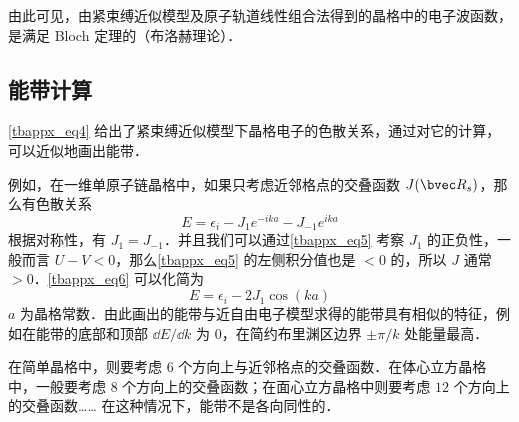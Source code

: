 由此可见，由紧束缚近似模型及原子轨道线性组合法得到的晶格中的电子波函数，是满足 Bloch 定理的（布洛赫理论）．

\subsection{能带计算}
\autoref{tbappx_eq4} 给出了紧束缚近似模型下晶格电子的色散关系，通过对它的计算，可以近似地画出能带．

例如，在一维单原子链晶格中，如果只考虑近邻格点的交叠函数 $J(\bvec R_s)$，那么有色散关系
\begin{equation}\label{tbappx_eq6}
E=\epsilon_i-J_1 e^{-i k a}-J_{-1}e^{ika}
\end{equation}
根据对称性，有 $J_1=J_{-1}$．并且我们可以通过\autoref{tbappx_eq5} 考察 $J_1$ 的正负性，一般而言 $U-V<0$，那么\autoref{tbappx_eq5} 的左侧积分值也是 $<0$ 的，所以 $J$ 通常 $>0$．\autoref{tbappx_eq6} 可以化简为
\begin{equation}
E=\epsilon_i-2J_1\cos(ka)
\end{equation}
$a$ 为晶格常数．由此画出的能带与近自由电子模型求得的能带具有相似的特征，例如在能带的底部和顶部 $\dd E/\dd k$ 为 $0$，在简约布里渊区边界 $\pm \pi/k$ 处能量最高．

在简单晶格中，则要考虑 $6$ 个方向上与近邻格点的交叠函数．在体心立方晶格中，一般要考虑 $8$ 个方向上的交叠函数；在面心立方晶格中则要考虑 $12$ 个方向上的交叠函数…… 在这种情况下，能带不是各向同性的．
